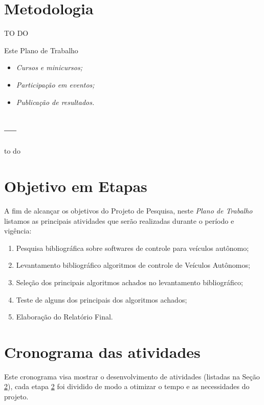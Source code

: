\documentclass{article}
\begin{document}
\section{Metodologia}
TO DO


\vspace {1mm}

Este Plano de Trabalho 

\begin{itemize}

\item \textit{Cursos e minicursos;}
\item \textit{Participação em eventos;}
\item \textit{Publicação de resultados.}

\end{itemize}


\subsection{---}

to do


\section{Objetivo em Etapas} \label{etapas}
A fim de alcançar os objetivos do Projeto de Pesquisa, neste \textit{Plano de Trabalho} listamos as principais atividades que serão realizadas durante o período e vigência:


\begin{enumerate}
    \item  Pesquisa bibliográfica sobre softwares de controle para veículos autônomo;
    \item Levantamento bibliográfico algoritmos de controle de Veículos Autônomos;
    \item  Seleção dos principais algoritmos achados no levantamento bibliográfico;
    \item Teste de alguns dos principais dos algoritmos achados;
    \item Elaboração do Relatório Final.
\end{enumerate}

\section{Cronograma das atividades}
Este cronograma visa mostrar o desenvolvimento de atividades (listadas na Seção \ref{etapas}), cada etapa \ref{etapas} foi dividido de modo a otimizar o tempo e as necessidades do projeto.
\end{document}

